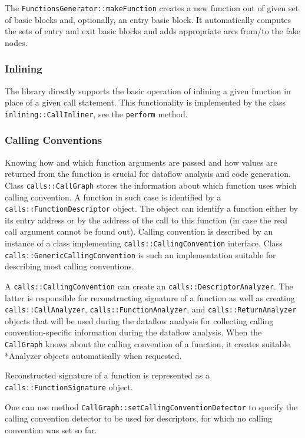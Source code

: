 \documentclass[a4paper,12pt]{article}
\newcommand{\ident}[1]{\texttt{#1}}
\begin{document}
The \ident{FunctionsGenerator::makeFunction} creates a new function out of given set of basic blocks and, optionally, an entry basic block.
It automatically computes the sets of entry and exit basic blocks and adds appropriate arcs from/to the fake nodes.

\subsubsection{Inlining}

The library directly supports the basic operation of inlining a given function in place of a given call statement.
This functionality is implemented by the class \ident{inlining::CallInliner}, see the \ident{perform} method.

\subsubsection{Calling Conventions}

Knowing how and which function arguments are passed and how values are returned from the function is crucial for dataflow analysis and code generation.
Class \ident{calls::CallGraph} stores the information about which function uses which calling convention.
A function in such case is identified by a \ident{calls::FunctionDescriptor} object.
The object can identify a function either by its entry address or by the address of the call to this function (in case the real call argument cannot be found out).
Calling convention is described by an instance of a class implementing \ident{calls::CallingConvention} interface.
Class \ident{calls::GenericCallingConvention} is such an implementation suitable for describing most calling conventions.

A \ident{calls::CallingConvention} can create an \ident{calls::DescriptorAnalyzer}.
The latter is responsible for reconstructing signature of a function as well as creating \ident{calls::CallAnalyzer}, \ident{calls::FunctionAnalyzer}, and \ident{calls::ReturnAnalyzer} objects that will be used during the dataflow analysis for collecting calling convention-specific information during the dataflow analysis.
When the \ident{CallGraph} knows about the calling convention of a function, it creates suitable *Analyzer objects automatically when requested.

Reconstructed signature of a function is represented as a \ident{calls::FunctionSignature} object.

One can use method \ident{CallGraph::setCallingConventionDetector} to specify the calling convention detector to be used for descriptors, for which no calling convention was set so far.
\end{document}
